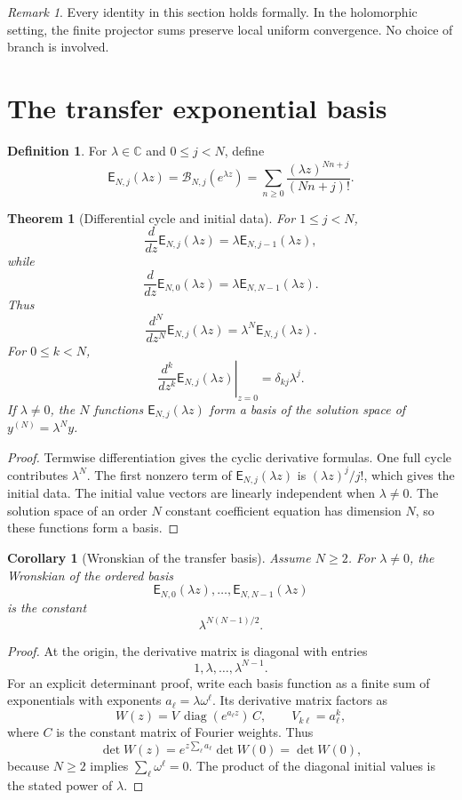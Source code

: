 \documentclass[11pt,letterpaper]{article}
\newtheorem{theorem}{Theorem}[section]
\newtheorem{corollary}[corollary]{Corollary}
\theoremstyle{definition}
\newtheorem{definition}[definition]{Definition}
\theoremstyle{remark}
\newtheorem{remark}[remark]{Remark}
\newcommand{\CC}{\mathbb C}
\newcommand{\Bcal}{\mathcal B}
\newcommand{\Efun}{\mathsf E}
\begin{document}
\begin{remark}\label{rem:formal_analytic}
Every identity in this section holds formally.  In the holomorphic setting, the finite projector sums preserve local uniform convergence.  No choice of branch is involved.
\end{remark}

\section{The transfer exponential basis}\label{sec:transfer_exponential}

\begin{definition}\label{def:transfer_exponential}
For $\lambda\in\CC$ and $0\leq j<N$, define
\[
\Efun_{N,j}(\lambda z)
=
\Bcal_{N,j}(e^{\lambda z})
=
\sum_{n\geq0}\frac{(\lambda z)^{Nn+j}}{(Nn+j)!}.
\]
\end{definition}

\begin{theorem}[Differential cycle and initial data]\label{thm:exponential_cycle}
For $1\leq j<N$,
\[
\frac{d}{dz}\Efun_{N,j}(\lambda z)
=
\lambda\Efun_{N,j-1}(\lambda z),
\]
while
\[
\frac{d}{dz}\Efun_{N,0}(\lambda z)
=
\lambda\Efun_{N,N-1}(\lambda z).
\]
Thus
\[
\frac{d^N}{dz^N}\Efun_{N,j}(\lambda z)
=
\lambda^N\Efun_{N,j}(\lambda z).
\]
For $0\leq k<N$,
\[
\left.\frac{d^k}{dz^k}\Efun_{N,j}(\lambda z)\right|_{z=0}
=
\delta_{kj}\lambda^j.
\]
If $\lambda\ne0$, the $N$ functions $\Efun_{N,j}(\lambda z)$ form a basis of the solution space of $y^{(N)}=\lambda^Ny$.
\end{theorem}

\begin{proof}
Termwise differentiation gives the cyclic derivative formulas.  One full cycle contributes $\lambda^N$.  The first nonzero term of $\Efun_{N,j}(\lambda z)$ is $(\lambda z)^j/j!$, which gives the initial data.  The initial value vectors are linearly independent when $\lambda\ne0$.  The solution space of an order $N$ constant coefficient equation has dimension $N$, so these functions form a basis.
\end{proof}


\begin{corollary}[Wronskian of the transfer basis]\label{cor:wronskians}
Assume $N\geq2$. For $\lambda\ne0$, the Wronskian of the ordered basis
\[
\Efun_{N,0}(\lambda z),\ldots,\Efun_{N,N-1}(\lambda z)
\]
is the constant
\[
\lambda^{N(N-1)/2}.
\]
\end{corollary}

\begin{proof}
At the origin, the derivative matrix is diagonal with entries
\[
1,\lambda,\ldots,\lambda^{N-1}.
\]
For an explicit determinant proof, write each basis function as a finite
sum of exponentials with exponents $a_\ell=\lambda\omega^\ell$.
Its derivative matrix factors as
\[
W(z)=V\,\operatorname{diag}(e^{a_\ell z})\,C,
\qquad V_{k\ell}=a_\ell^k,
\]
where $C$ is the constant matrix of Fourier weights. Thus
\[
\det W(z)=e^{z\sum_\ell a_\ell}\det W(0)=\det W(0),
\]
because $N\geq2$ implies $\sum_\ell\omega^\ell=0$.
The product of the diagonal initial values is the stated power of $\lambda$.
\end{proof}
\end{document}
